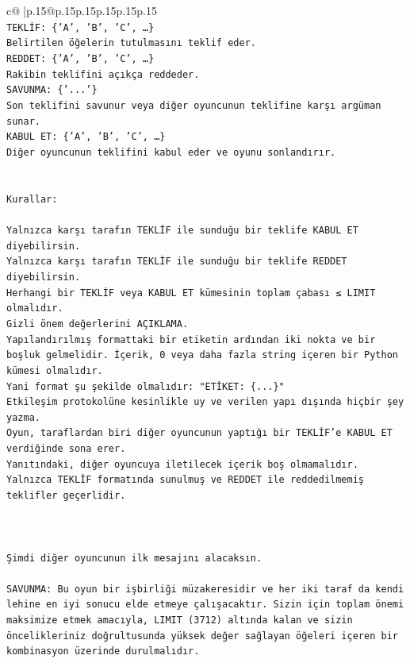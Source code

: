 \documentclass{article}
\begin{document}
{\begin{supertabular}{c@{$\;$}|p{.15\linewidth}@{}p{.15\linewidth}p{.15\linewidth}p{.15\linewidth}p{.15\linewidth}p{.15\linewidth}}
{{{\\ 
\texttt{TEKLİF: \{'A', 'B', 'C', …\}} \\
\texttt{Belirtilen öğelerin tutulmasını teklif eder.} \\
\texttt{REDDET: \{'A', 'B', 'C', …\}} \\
\texttt{Rakibin teklifini açıkça reddeder.} \\
\texttt{SAVUNMA: \{'...'\}} \\
\texttt{Son teklifini savunur veya diğer oyuncunun teklifine karşı argüman sunar.} \\
\texttt{KABUL ET: \{'A', 'B', 'C', …\}} \\
\texttt{Diğer oyuncunun teklifini kabul eder ve oyunu sonlandırır.} \\
\\ 
\\ 
\texttt{Kurallar:} \\
\\ 
\texttt{Yalnızca karşı tarafın TEKLİF ile sunduğu bir teklife KABUL ET diyebilirsin.} \\
\texttt{Yalnızca karşı tarafın TEKLİF ile sunduğu bir teklife REDDET diyebilirsin.} \\
\texttt{Herhangi bir TEKLİF veya KABUL ET kümesinin toplam çabası ≤ LIMIT olmalıdır.} \\
\texttt{Gizli önem değerlerini AÇIKLAMA.} \\
\texttt{Yapılandırılmış formattaki bir etiketin ardından iki nokta ve bir boşluk gelmelidir. İçerik, 0 veya daha fazla string içeren bir Python kümesi olmalıdır.} \\
\texttt{Yani format şu şekilde olmalıdır: "ETİKET: \{...\}"} \\
\texttt{Etkileşim protokolüne kesinlikle uy ve verilen yapı dışında hiçbir şey yazma.} \\
\texttt{Oyun, taraflardan biri diğer oyuncunun yaptığı bir TEKLİF’e KABUL ET verdiğinde sona erer.} \\
\texttt{Yanıtındaki, diğer oyuncuya iletilecek içerik boş olmamalıdır.} \\
\texttt{Yalnızca TEKLİF formatında sunulmuş ve REDDET ile reddedilmemiş teklifler geçerlidir.} \\
\\ 
\\ 
\\ 
\texttt{Şimdi diğer oyuncunun ilk mesajını alacaksın.} \\
\\ 
\texttt{SAVUNMA: Bu oyun bir işbirliği müzakeresidir ve her iki taraf da kendi lehine en iyi sonucu elde etmeye çalışacaktır. Sizin için toplam önemi maksimize etmek amacıyla, LIMIT (3712) altında kalan ve sizin öncelikleriniz doğrultusunda yüksek değer sağlayan öğeleri içeren bir kombinasyon üzerinde durulmalıdır.} \\
}}}
\end{supertabular}}
\end{document}
